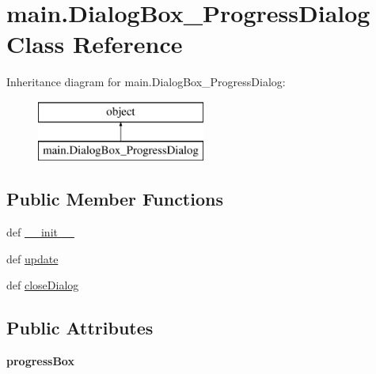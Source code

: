 \hypertarget{classmain_1_1_dialog_box___progress_dialog}{\section{main.\-Dialog\-Box\-\_\-\-Progress\-Dialog Class Reference}
\label{classmain_1_1_dialog_box___progress_dialog}
}
Inheritance diagram for main.\-Dialog\-Box\-\_\-\-Progress\-Dialog\-:\begin{figure}[H]
\begin{center}
\leavevmode
\includegraphics[height=2.000000cm]{classmain_1_1_dialog_box___progress_dialog}
\end{center}
\end{figure}
\subsection*{Public Member Functions}
\begin{DoxyCompactItemize}
\item 
def \hyperlink{classmain_1_1_dialog_box___progress_dialog_a66fb462be9f698c5b2fdd7f01575d4b5}{\-\_\-\-\_\-init\-\_\-\-\_\-}
\item 
def \hyperlink{classmain_1_1_dialog_box___progress_dialog_a706b5e9b511ec5793b02d21de574ed89}{update}
\item 
def \hyperlink{classmain_1_1_dialog_box___progress_dialog_a0df4c98643e44068ad4ea8b00e2cbad2}{close\-Dialog}
\end{DoxyCompactItemize}
\subsection*{Public Attributes}
\begin{DoxyCompactItemize}
\item 
\hypertarget{classmain_1_1_dialog_box___progress_dialog_a54c942e4e201a1e2a443c320eb94619f}{{\bfseries progress\-Box}}\label{classmain_1_1_dialog_box___progress_dialog_a54c942e4e201a1e2a443c320eb94619f}

\end{DoxyCompactItemize}


